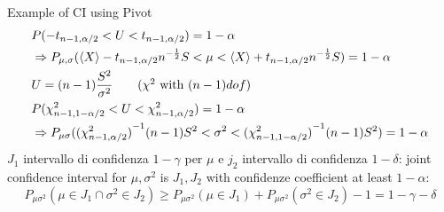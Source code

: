 \documentclass[asd-beamer.tex]{subfiles}
\begin{document}
\begin{frame}[allowframebreaks]{Example of CI using Pivot}
\begin{align*}
	&P(-t_{n-1,\alpha/2}<U<t_{n-1,\alpha/2})=1-\alpha\\
	&\Rightarrow P_{\mu,\sigma}(\langle X \rangle-t_{n-1,\alpha/2}n^{-\frac{1}{2}}S<\mu<\langle X \rangle+t_{n-1,\alpha/2}n^{-\frac{1}{2}}S)=1-\alpha\\
	&U=(n-1)\frac{S^2}{\sigma^2}\tag{$\chi^2$ with $(n-1) dof$}\\
	&P(\chi^2_{n-1,1-\alpha/2}<U<\chi^2_{n-1,\alpha/2})=1-\alpha\\
	&\Rightarrow P_{\mu\sigma}({(\chi^2_{n-1,\alpha/2})}^{-1}(n-1)S^2<\sigma^2<{(\chi^2_{n-1,1-\alpha/2})}^{-1}(n-1)S^2)=1-\alpha
	\end{align*}
	$J_1$ intervallo di confidenza $1-\gamma$ per $\mu$ e $j_2$ intervallo di confidenza $1-\delta$: joint confidence interval for $\mu,\sigma^2$ is ${J_1,J_2}$ with confidenze coefficient at least $1-\alpha$:
	\[P_{\mu\sigma^2}(\mu\in J_1\cap\sigma^2\in J_2)\geq P_{\mu\sigma^2}(\mu\in J_1)+P_{\mu\sigma^2}(\sigma^2\in J_2)-1=1-\gamma-\delta\]
\end{frame}
\end{document}
